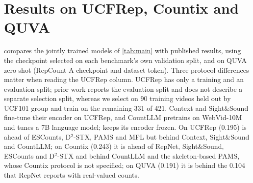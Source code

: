 \section{Results on UCFRep, Countix and QUVA}
\label{app:other}
 compares the jointly trained models of \cref{tab:main} with
published results, using the checkpoint selected on each benchmark's own validation
split, and on QUVA zero-shot (RepCount-A checkpoint and dataset token).
Three protocol differences matter when reading the UCFRep column. UCFRep has only
a training and an evaluation split; prior work reports the evaluation split and
does not describe a separate selection split, whereas we select on 90 training
videos held out by UCF101 group and train on the remaining 331 of 421. Context and
Sight\&Sound fine-tune their encoder on UCFRep, and CountLLM pretrains on
WebVid-10M and tunes a 7B language model; \method keeps its encoder frozen.
On UCFRep \method (0.195) is ahead of ESCounts, D$^2$-STX, PAMS and MFL but behind
Context, Sight\&Sound and CountLLM; on Countix (0.243) it is ahead of RepNet,
Sight\&Sound, ESCounts and D$^2$-STX and behind CountLLM and the skeleton-based
PAMS, whose Countix protocol is not specified; on QUVA (0.191) it is
behind the 0.104 that RepNet reports with real-valued counts.

